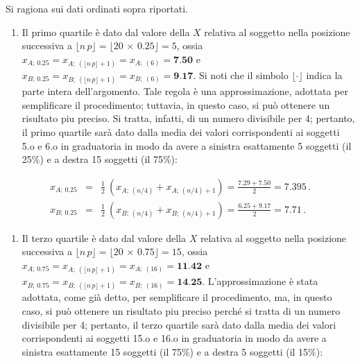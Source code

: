 \documentclass[
  11pt,
]{book}
\providecommand{\tightlist}{%
  \setlength{\itemsep}{0pt}\setlength{\parskip}{0pt}}
\theoremstyle{mytheoremstyle}
\theoremstyle{mydefstyle}
\newenvironment{sol}
  {
  \begin{tcolorbox}[enhanced,breakable,arc=0.1mm,boxrule=1pt,colback=white,colframe=iblue,
  title=\bf \fontfamily{lmss}\selectfont \hspace{.5 cm} Soluzione,drop fuzzy shadow]

}{
\end{tcolorbox}
  }
\begin{document}
\begin{sol}
Si ragiona sui dati ordinati sopra riportati.

\begin{enumerate}
\def\labelenumi{\alph{enumi}.}
\setcounter{enumi}{3}
\tightlist
\item
  Il primo quartile è dato dal valore della \(X\) relativa
  al soggetto nella posizione successiva a \(\lfloor n\, p \rfloor =
  \lfloor 20 \,\times\, 0.25 \rfloor = 5\), ossia \(x_{A;\, 0.25} =
  x_{A;\ (\lfloor n\, p \rfloor + 1)} = x_{A;\ (6)} = \textbf{7.50}\)
  e \(x_{B;\, 0.25} = x_{B;\ (\lfloor n\, p \rfloor + 1)} =
  x_{B;\ (6)} = \textbf{9.17}\).
  Si noti che il simbolo \(\lfloor \cdot \rfloor\) indica la parte
  intera dell'argomento.
  Tale regola è una approssimazione, adottata per semplificare
  il procedimento; tuttavia, in questo caso, si può ottenere un
  risultato pi\textquotesingle u preciso.
  Si tratta, infatti, di un numero divisibile per 4; pertanto, il
  primo quartile sarà dato dalla media dei valori corrispondenti
  ai soggetti 5.o e 6.o in graduatoria in modo da avere a sinistra
  esattamente 5 soggetti (il 25\%) e a destra 15 soggetti (il 75\%):
\end{enumerate}

\begin{eqnarray*}
x_{A;\, 0.25} &=& \frac{1} {2}\ \left( x_{A;\, (n/4)} + x_{A;\, (n/4)+1} \right)
               =  \frac{7.29 + 7.50} {2} = 7.395 \,. \\
x_{B;\, 0.25} &=& \frac{1} {2}\ \left( x_{B;\, (n/4)} + x_{B;\, (n/4)+1} \right)
               =  \frac{6.25 + 9.17} {2} = 7.71 \,.
\end{eqnarray*}

\begin{enumerate}
\def\labelenumi{\alph{enumi}.}
\setcounter{enumi}{4}
\tightlist
\item
  Il terzo quartile è dato dal valore della \(X\) relativa
  al soggetto nella posizione successiva a \(\lfloor n\, p \rfloor =
  \lfloor 20 \,\times\, 0.75 \rfloor = 15\), ossia \(x_{A;\, 0.75} =
  x_{A;\ (\lfloor n\, p \rfloor + 1)} = x_{A;\ (16)} = \textbf{11.42}\)
  e \(x_{B;\, 0.75} = x_{B;\ (\lfloor n\, p \rfloor + 1)} =
  x_{B;\ (16)} = \textbf{14.25}\).
  L'approssimazione è stata adottata, come già detto, per semplificare
  il procedimento, ma, in questo caso, si può ottenere un risultato pi\textquotesingle u
  preciso perché si tratta di un numero divisibile per 4; pertanto, il terzo
  quartile sarà dato dalla media dei valori corrispondenti ai soggetti 15.o
  e 16.o in graduatoria in modo da avere a sinistra esattamente 15 soggetti
  (il 75\%) e a destra 5 soggetti (il 15\%):
\end{enumerate}


\end{sol}
\end{document}
